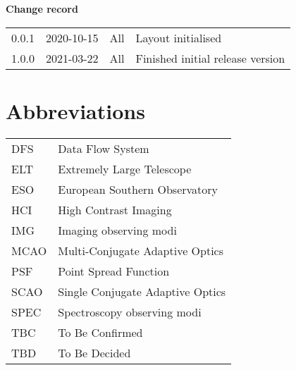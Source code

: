 
\dmdmaketitle


\begin{center}
  \textbf{Change record}

  \tabletail{\hline}

  \begin{supertabular}{|l|l|l|l|}
   0.0.1 & 2020-10-15 & All & Layout initialised \\
   1.0.0 & 2021-03-22 & All & Finished initial release version \\
   \hline
  \end{supertabular}

\end{center}


\setcounter{tocdepth}{3}
\tableofcontents



\section*{Abbreviations}
\label{sec:abbreviations}


\tablehead{}
\tabletail{}
\begin{supertabular}{ll}
  DFS & Data Flow System \\
  ELT & Extremely Large Telescope \\
  ESO & European Southern Observatory \\
  HCI & High Contrast Imaging \\
  IMG & Imaging observing modi \\
  MCAO & Multi-Conjugate Adaptive Optics \\
  PSF & Point Spread Function \\
  SCAO & Single Conjugate Adaptive Optics \\
  SPEC & Spectroscopy observing modi \\
  TBC & To Be Confirmed \\
  TBD & To Be Decided \\
\end{supertabular}



